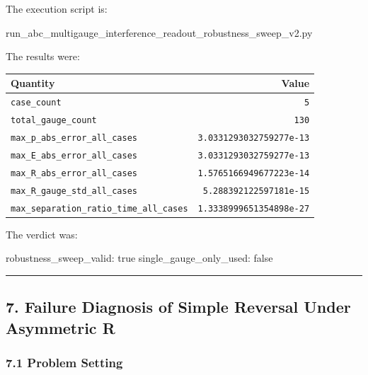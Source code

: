 \documentclass[
  a4paper,
]{article}
\newenvironment{Shaded}{}{}
\newcommand{\NormalTok}[1]{#1}
\newcounter{none} %
\begin{document}
The execution script is:

\begin{Shaded}
\begin{Highlighting}[]
\NormalTok{run\_abc\_multigauge\_interference\_readout\_robustness\_sweep\_v2.py}
\end{Highlighting}
\end{Shaded}

The results were:

{\def\LTcaptype{none} %
\begin{longtable}[]{@{}lr@{}}
\toprule\noalign{}
Quantity & Value \\
\midrule\noalign{}
\endhead
\bottomrule\noalign{}
\endlastfoot
\texttt{case\_count} & \texttt{5} \\
\texttt{total\_gauge\_count} & \texttt{130} \\
\texttt{max\_p\_abs\_error\_all\_cases} &
\texttt{3.0331293032759277e-13} \\
\texttt{max\_E\_abs\_error\_all\_cases} &
\texttt{3.0331293032759277e-13} \\
\texttt{max\_R\_abs\_error\_all\_cases} &
\texttt{1.5765166949677223e-14} \\
\texttt{max\_R\_gauge\_std\_all\_cases} &
\texttt{5.288392122597181e-15} \\
\texttt{max\_separation\_ratio\_time\_all\_cases} &
\texttt{1.3338999651354898e-27} \\
\end{longtable}
}

The verdict was:

\begin{Shaded}
\begin{Highlighting}[]
\NormalTok{robustness\_sweep\_valid: true}
\NormalTok{single\_gauge\_only\_used: false}
\end{Highlighting}
\end{Shaded}

\begin{center}\rule{0.5\linewidth}{0.5pt}\end{center}

\subsection{7. Failure Diagnosis of Simple Reversal Under Asymmetric
R}\label{failure-diagnosis-of-simple-reversal-under-asymmetric-r}

\subsubsection{7.1 Problem Setting}\label{problem-setting}
\end{document}
